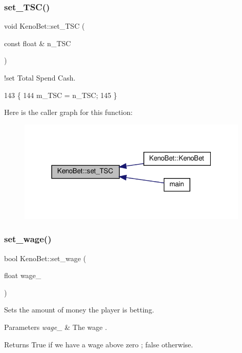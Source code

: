 \subsubsection{\texorpdfstring{set\+\_\+\+T\+S\+C()}{set\_TSC()}}
{\footnotesize\ttfamily void Keno\+Bet\+::set\+\_\+\+T\+SC (\begin{DoxyParamCaption}\item[{const float \&}]{n\+\_\+\+T\+SC }\end{DoxyParamCaption})}



!set Total Spend Cash. 


\begin{DoxyCode}
143 \{
144     m\_TSC = n\_TSC;
145 \}
\end{DoxyCode}
Here is the caller graph for this function\+:
\nopagebreak
\begin{figure}[H]
\begin{center}
\leavevmode
\includegraphics[width=313pt]{classKenoBet_abd6b6b0b0ed9c3d030a71673dc89f39a_icgraph}
\end{center}
\end{figure}
\mbox{\label{classKenoBet_a2b21e387cde33818230d9895845b2d9a}} 
\subsubsection{\texorpdfstring{set\+\_\+wage()}{set\_wage()}}
{\footnotesize\ttfamily bool Keno\+Bet\+::set\+\_\+wage (\begin{DoxyParamCaption}\item[{float}]{wage\+\_\+ }\end{DoxyParamCaption})}



Sets the amount of money the player is betting. 


\begin{DoxyParams}{Parameters}
{\em wage\+\_\+} & The wage . \\
\hline
\end{DoxyParams}
\begin{DoxyReturn}{Returns}
True if we have a wage above zero ; false otherwise. 
\end{DoxyReturn}

